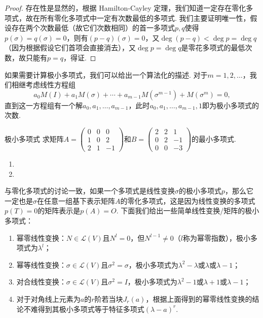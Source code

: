 \begin{proof}
    存在性是显然的，根据 Hamilton-Cayley 定理，我们知道一定存在零化多项式，故在所有零化多项式中一定有次数最低的多项式. 我们主要证明唯一性，假设存在两个次数最低（故它们次数相同）的首一多项式$p,q$使得$p(\sigma)=q(\sigma)=0$，则有$(p-q)(\sigma)=0$，又$\deg(p-q)<\deg p=\deg q$（因为根据假设它们首项会直接消去），又$\deg p=\deg q$是零花多项式的最低次数，故只能有$p=q$，得证.
\end{proof}

如果需要计算极小多项式，我们可以给出一个算法化的描述. 对于$m=1,2,\ldots$，我们相继考虑线性方程组
\[a_0M(I)+a_1M(\sigma)+\cdots+a_{m-1}M(\sigma^{m-1})+M(\sigma^m)=0,\]
直到这一方程组有一个解$a_0,a_1,\ldots,a_{m-1}$，此时$a_0,a_1,\ldots,a_{m-1},1$即为极小多项式的次数.
\begin{example}{}{极小多项式}
    求矩阵$A=\begin{pmatrix}
            0 & 0 & 0 \\ 1 & 0 & 2 \\ 2 & 1 & -1
        \end{pmatrix}$和$B=\begin{pmatrix}
            2 & 2 & 1 \\ 0 & 2 & -1 \\ 0 & 0 & -3
        \end{pmatrix}$的最小多项式.
\end{example}

\begin{solution}
    \begin{enumerate}
        \item

        \item
    \end{enumerate}
\end{solution}

与零化多项式的讨论一致，如果一个多项式是线性变换$\sigma$的极小多项式$p$，那么它一定也是$\sigma$在任意一组基下表示矩阵$A$的零化多项式，这是因为线性变换的多项式$p(T)=0$的矩阵表示是$p(A)=O$. 下面我们给出一些简单线性变换/矩阵的极小多项式：
\begin{enumerate}
    \item 幂零线性变换：$N\in \mathcal{L}(V)$且$N^l=0$，但$N^{l-1}\neq 0$（$l$称为幂零指数），极小多项式为$\lambda^l$；

    \item 幂等线性变换：$\sigma\in \mathcal{L}(V)$且$\sigma^2=\sigma$，极小多项式为$\lambda^2-\lambda$或$\lambda$或$\lambda-1$；

    \item 对合线性变换：$\sigma\in \mathcal{L}(V)$且$\sigma^2=I$，极小多项式为$\lambda^2-1$或$\lambda+1$或$\lambda-1$；

    \item 对于对角线上元素为$a$的$r$阶若当块$J_r(a)$，根据上面得到的幂零线性变换的结论不难得到其极小多项式等于特征多项式$(\lambda-a)^r$.
\end{enumerate}


